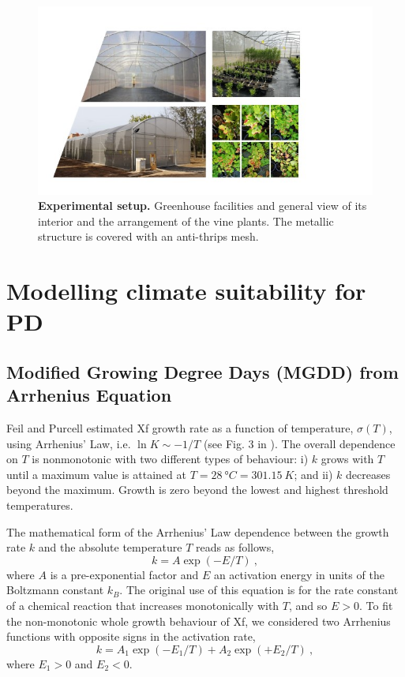 \begin{figure}[H]
    \centering
    \includegraphics[width=\textwidth]{Figures/Experimental setup.jpg}
    \caption[Experimental setup]{\textbf{Experimental setup.} Greenhouse
        facilities and general
        view of its interior and the arrangement of the vine plants. The
        metallic
        structure is covered with an anti-thrips mesh.}
    \label{fig:experimental_setup} %
\end{figure}

\section{Modelling climate suitability for PD}\label{app:S2}
\subsection{Modified Growing Degree Days (MGDD) from Arrhenius
    Equation}\label{app:MGDD} %

Feil and Purcell estimated Xf growth rate as a function of temperature,
$\sigma(T)$, using Arrhenius’ Law, i.e. $\ln K \sim -1/T$ (see Fig. 3 in
\cite{Feil2001}). The overall dependence on $T$ is nonmonotonic with two
different types of behaviour: i) $k$ grows with $T$ until a maximum value is
attained at $T=\SI{28}{\degree C}=\SI{301.15}{K}$; and ii) $k$ decreases beyond
the maximum. Growth is zero beyond the lowest and highest threshold
temperatures.

The mathematical form of the Arrhenius' Law dependence between the growth
rate $k$ and the absolute temperature $T$ reads as follows,
\begin{equation}
    k = A \exp(-E/T) \ ,
\end{equation}
where $A$ is a pre-exponential factor and $E$ an activation energy in units
of the Boltzmann constant $k_B$. The original use of this equation is for the
rate constant of a chemical reaction that increases monotonically with $T$, and
so $E>0$.  To fit the non-monotonic whole growth behaviour of Xf, we considered
two Arrhenius functions with opposite signs in the activation rate,
\begin{equation}\label{eq: Arrhenius_2}
    k =A_1 \exp(-E_1/T) + A_2 \exp(+E_2/T) \ ,
\end{equation}
where $E_1>0$ and $E_2<0$.\\

